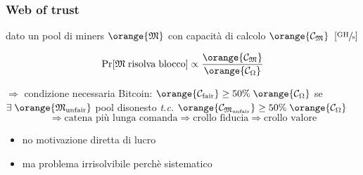 \begin{frame}
	\frametitle{Web of trust}
	
	dato un pool di miners $\orange{\mathfrak{M}}$ con capacità di calcolo $\orange{\mathcal{C}_\mathfrak{M}} \;\;[\sfrac{\mathrm{GH}}{\mathrm{s}}] $ 
	
	$$\Pr[\mathfrak{M} \mathrm{\;risolva\;blocco}] \propto \frac{\orange{\mathcal{C}_\mathfrak{M}}}{\orange{\mathcal{C}_{\Omega}}} $$
	
	$\Rightarrow$ {\color{blue} condizione necessaria Bitcoin}: \:$\orange{\mathcal{C}_{\mathrm{fair}}} \geq 50\%\;\orange{\mathcal{C}_{\Omega}} $ 
	\newline \newline
	se $\exists\;\orange{\mathfrak{M}_{\mathrm{unfair}}}$ pool disonesto \textit{t.c.} 
		$\orange{\mathcal{C}_{\mathfrak{M}_{\mathrm{unfair}}}} \geq 50\%\;\orange{\mathcal{C}_{\Omega}} $ 
	$$\Rightarrow \text{catena più lunga comanda} \Rightarrow \text{crollo fiducia} \Rightarrow \text{crollo valore}$$
	\begin{itemize}
		\item no motivazione diretta di lucro
		\item ma problema irrisolvibile perchè sistematico
	\end{itemize}
	
\end{frame}
